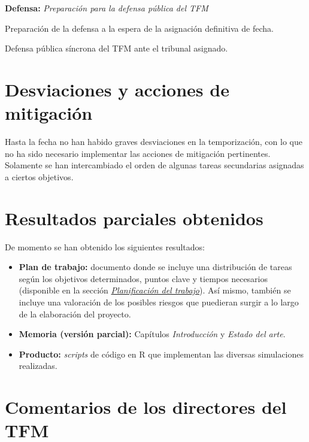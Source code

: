 \documentclass[IB,BIB]{TFUOC}%
\begin{document}
\begin{todolist}
  \item \textbf{Defensa:} \textit{Preparación para la defensa pública del TFM}
  \begin{todolist}
  \item Preparación de la defensa a la espera de la asignación definitiva de fecha.
  \item Defensa pública síncrona del TFM ante el tribunal asignado.
  \end{todolist}
\end{todolist}


\section{Desviaciones y acciones de mitigación}
\label{sec:Desviaciones y acciones de mitigación}

Hasta la fecha no han habido graves desviaciones en la temporización, con lo que no ha sido necesario implementar las acciones de mitigación pertinentes. Solamente se han intercambiado el orden de algunas tareas secundarias asignadas a ciertos objetivos.


\section{Resultados parciales obtenidos}
\label{sec:Resultados parciales obtenidos}

De momento se han obtenido los siguientes resultados:

\footnotesize

\begin{itemize}
    \item \textbf{Plan de trabajo:} documento donde se incluye una distribución de tareas según los objetivos determinados, puntos clave y tiempos necesarios (disponible en la sección \textit{\hyperref[sec:Planificación del trabajo]{Planificación del trabajo}}). Así mismo, también se incluye una valoración de los posibles riesgos que puedieran surgir a lo largo de la elaboración del proyecto.
    \item \textbf{Memoria (versión parcial):} Capítulos \textit{Introducción} y \textit{Estado del arte}.
    \item \textbf{Producto:} \textit{scripts} de código en R que implementan las diversas simulaciones realizadas.
\end{itemize}

\normalsize

\section{Comentarios de los directores del TFM}
\label{sec:Comentarios de los directores del TFM}
\end{document}
